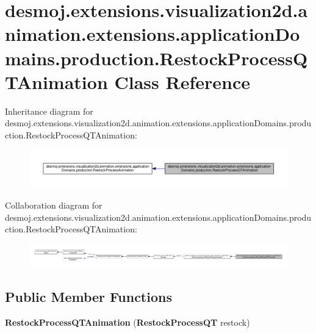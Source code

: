 \section{desmoj.\-extensions.\-visualization2d.\-animation.\-extensions.\-application\-Domains.\-production.\-Restock\-Process\-Q\-T\-Animation Class Reference}
\label{classdesmoj_1_1extensions_1_1visualization2d_1_1animation_1_1extensions_1_1application_domains_12438f615e513ec6d0f8b8d081beca8ae}


Inheritance diagram for desmoj.\-extensions.\-visualization2d.\-animation.\-extensions.\-application\-Domains.\-production.\-Restock\-Process\-Q\-T\-Animation\-:
\nopagebreak
\begin{figure}[H]
\begin{center}
\leavevmode
\includegraphics[width=350pt]{classdesmoj_1_1extensions_1_1visualization2d_1_1animation_1_1extensions_1_1application_domains_1d22f294c8defb07cad8d427a4d96c21b}
\end{center}
\end{figure}


Collaboration diagram for desmoj.\-extensions.\-visualization2d.\-animation.\-extensions.\-application\-Domains.\-production.\-Restock\-Process\-Q\-T\-Animation\-:
\nopagebreak
\begin{figure}[H]
\begin{center}
\leavevmode
\includegraphics[width=350pt]{classdesmoj_1_1extensions_1_1visualization2d_1_1animation_1_1extensions_1_1application_domains_13e832773824f00290212fb917284084b}
\end{center}
\end{figure}
\subsection*{Public Member Functions}
\begin{DoxyCompactItemize}
\item 
{\bfseries Restock\-Process\-Q\-T\-Animation} ({\bf Restock\-Process\-Q\-T} restock)\label{classdesmoj_1_1extensions_1_1visualization2d_1_1animation_1_1extensions_1_1application_domains_12438f615e513ec6d0f8b8d081beca8ae_a5bd8867ebff6c11edb0055a8384076b5}

\end{DoxyCompactItemize}
